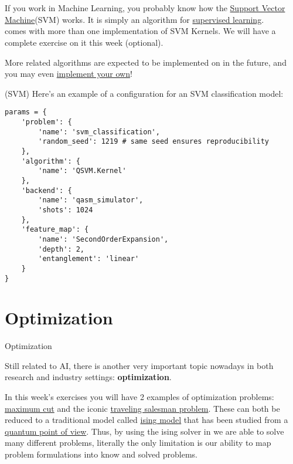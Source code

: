 \documentclass[aspectratio=43]{beamer}
\begin{document}
\section{\ai}
\begin{frame}{\ai}
\begin{card}
    If you work in Machine Learning, you probably know how the  \href{https://en.wikipedia.org/wiki/Support_vector_machine}{Support Vector Machine}(SVM) works. It is simply an algorithm for \href{https://en.wikipedia.org/wiki/Supervised_learning}{supervised learning}.\\
    \qka comes with more than one implementation of SVM Kernels. We will have a complete exercise on it this week (optional). 
\end{card}
\begin{card}
    More \ai related algorithms are expected to be implemented on \qka in the future, and you may even \href{https://qiskit.org/documentation/aqua/extending.html#algorithms}{implement your own}!
\end{card}
\pagenumber
\end{frame}

\begin{frame}[fragile]{\ai (SVM)}
\small{Here's an example of a configuration for an SVM classification model:}\begin{verbatim}
params = {
    'problem': {
        'name': 'svm_classification',
        'random_seed': 1219 # same seed ensures reproducibility
    },
    'algorithm': {
        'name': 'QSVM.Kernel'
    },
    'backend': {
        'name': 'qasm_simulator',
        'shots': 1024
    },
    'feature_map': {
        'name': 'SecondOrderExpansion',
        'depth': 2,
        'entanglement': 'linear'
    }
}
\end{verbatim}
\end{frame}

\section{Optimization}
\begin{frame}{Optimization}
\begin{cardTiny}
    Still related to AI, there is another very important topic nowadays in both research and industry settings: \textbf{optimization}.
\end{cardTiny}
\begin{cardTiny}
    In this week's exercises you will have 2 examples of optimization problems: \href{https://en.wikipedia.org/wiki/Maximum_cut}{maximum cut} and the iconic \href{https://en.wikipedia.org/wiki/Travelling_salesman_problem}{traveling salesman problem}. These can both be reduced to a traditional model called \href{https://en.wikipedia.org/wiki/Ising_model}{ising model} that has been studied from a \href{https://arxiv.org/ftp/arxiv/papers/1210/1210.0113.pdf}{quantum point of view}. Thus, by using the ising solver in \qka we are able to solve many different problems, literally the only limitation is our ability to map problem formulations into know and solved problems.
\end{cardTiny}
\pagenumber
\end{frame}
\end{document}
